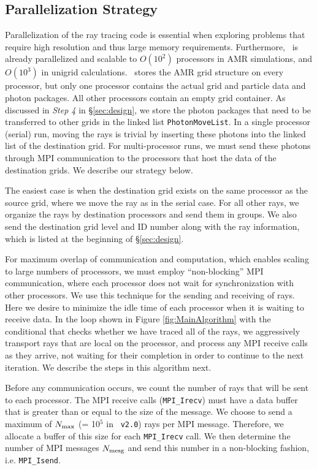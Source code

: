 \documentclass[12pt,preprint]{aastex}
\begin{document}
\subsection{Parallelization Strategy}

Parallelization of the ray tracing code is essential when exploring
problems that require high resolution and thus large memory
requirements.  Furthermore, \enzo~is already parallelized and scalable
to $O(10^2)$ processors in AMR simulations, and $O(10^3)$ in unigrid
calculations.  \enzo~stores the AMR grid structure on every processor,
but only one processor contains the actual grid and particle data and
photon packages.  All other processors contain an empty grid
container.  As discussed in \textit{Step 4} in \S\ref{sec:design}, we
store the photon packages that need to be transferred to other grids
in the linked list \texttt{PhotonMoveList}.  In a single processor
(serial) run, moving the rays is trivial by inserting these photons
into the linked list of the destination grid.  For multi-processor
runs, we must send these photons through MPI communication to the
processors that host the data of the destination grids.  We describe
our strategy below.

The easiest case is when the destination grid exists on the same
processor as the source grid, where we move the ray as in the serial
case.  For all other rays, we organize the rays by destination
processors and send them in groups.  We also send the destination grid
level and ID number along with the ray information, which is listed at
the beginning of \S\ref{sec:design}.  

For maximum overlap of communication and computation, which enables
scaling to large numbers of processors, we must employ
``non-blocking'' MPI communication, where each processor does not wait
for synchronization with other processors.  We use this technique for
the sending and receiving of rays.  Here we desire to minimize the
idle time of each processor when it is waiting to receive data.  In
the loop shown in Figure \ref{fig:MainAlgorithm} with the conditional
that checks whether we have traced all of the rays, we aggressively
transport rays that are local on the processor, and process any MPI
receive calls as they arrive, not waiting for their completion in
order to continue to the next iteration.  We describe the steps in
this algorithm next.

 Before any communication occurs, we count the number of rays
that will be sent to each processor.  The MPI receive calls
(\texttt{MPI\_Irecv}) must have a data buffer that is greater than or
equal to the size of the message.  We choose to send a maximum of
$N_{\rm max}$ (= 10$^5$ in \enzo~\texttt{v2.0}) rays per MPI message.
Therefore, we allocate a buffer of this size for each
\texttt{MPI\_Irecv} call.  We then determine the number of MPI messages
$N_{\rm mesg}$ and send this number in a non-blocking fashion,
i.e. \texttt{MPI\_Isend}.
\end{document}
